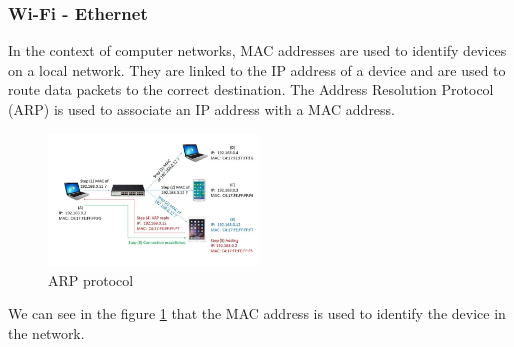 \documentclass[aps,prb,twocolumn,superscriptaddress,floatfix,longbibliography,nofootinbib]{revtex4-2}
\begin{document}
    \subsubsection{\label{subsec:Wi-Fi}Wi-Fi - Ethernet}
  In the context of computer networks, MAC addresses are used to identify devices on a local network.
  They are linked to the IP address of a device and are used to route data packets to the correct destination.
  The Address Resolution Protocol (ARP) is used to associate an IP address with a MAC address.

  \begin{figure}[H]
      \centering
      \includegraphics[width=0.5\textwidth]{pictures/arp.jpg}
      \caption{ARP protocol \cite{ARP}}
      \label{fig:ARP}
  \end{figure}
  We can see in the figure \ref{fig:ARP} that the MAC address is used to identify the device in the network.



\end{document}

